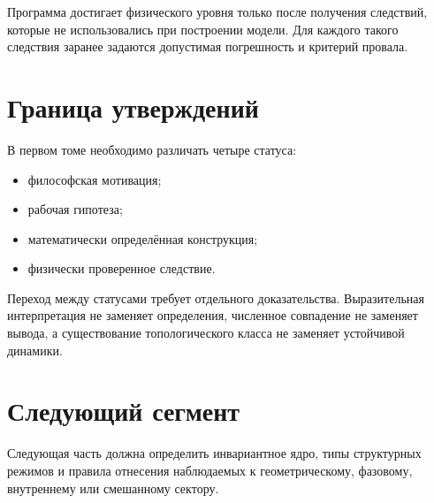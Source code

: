 Программа достигает физического уровня только после получения следствий,
которые не использовались при построении модели. Для каждого такого следствия
заранее задаются допустимая погрешность и критерий провала.

\chapter{Граница утверждений}

В первом томе необходимо различать четыре статуса:
\begin{itemize}
 \item философская мотивация;
 \item рабочая гипотеза;
 \item математически определённая конструкция;
 \item физически проверенное следствие.
\end{itemize}

Переход между статусами требует отдельного доказательства. Выразительная
интерпретация не заменяет определения, численное совпадение не заменяет вывода,
а существование топологического класса не заменяет устойчивой динамики.

\chapter{Следующий сегмент}

Следующая часть должна определить инвариантное ядро, типы структурных режимов
и правила отнесения наблюдаемых к геометрическому, фазовому, внутреннему или
смешанному сектору.